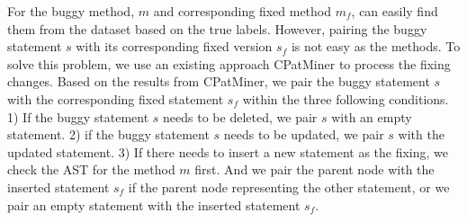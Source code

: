 For the buggy method, $m$ and corresponding fixed method $m_f$, \tool can easily find them from the dataset based on the true labels. However, pairing the buggy statement $s$ with its corresponding fixed version $s_f$ is not easy as the methods. To solve this problem, we use an existing approach CPatMiner \cite{nguyen2019graph} to process the fixing changes. Based on the results from CPatMiner, we pair the buggy statement $s$ with the corresponding fixed statement $s_f$ within the three following conditions. 1) If the buggy statement $s$ needs to be deleted, we pair $s$ with an empty statement. 2) if the buggy statement $s$ needs to be updated, we pair $s$ with the updated statement. 3) If there needs to insert a new statement as the fixing, we check the AST for the method $m$ first. And we pair the parent node with the inserted statement $s_f$ if the parent node representing the other statement, or we pair an empty statement with the inserted statement $s_f$. 